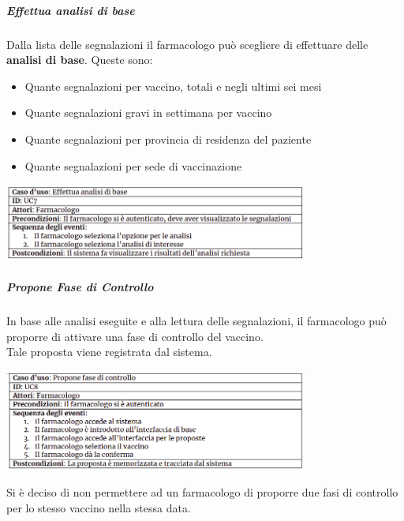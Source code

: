 \documentclass[11pt]{article}
\begin{document}
    \newpage
        \subparagraph*{Effettua analisi di base}
        Dalla lista delle segnalazioni il farmacologo può scegliere di effettuare delle \textbf{analisi di base}. Queste sono:
            \begin{itemize}
                \item Quante segnalazioni per vaccino, totali e negli ultimi sei mesi
                \item Quante segnalazioni gravi in settimana per vaccino
                \item Quante segnalazioni per provincia di residenza del paziente
                \item Quante segnalazioni per sede di vaccinazione
            \end{itemize}
            \begin{center}
                \includegraphics[width=0.75\textwidth]{pictures/UC7.png}
            \end{center}
        \subparagraph*{Propone Fase di Controllo}
            In base alle analisi eseguite e alla lettura delle segnalazioni, il farmacologo può proporre di attivare una fase di controllo del vaccino.\\
            Tale proposta viene registrata dal sistema.
                \begin{center}
                    \includegraphics[width=0.75\textwidth]{pictures/UC8.png}
                \end{center}
            Si è deciso di non permettere ad un farmacologo di proporre due fasi di controllo per lo stesso vaccino nella stessa data.
\end{document}
